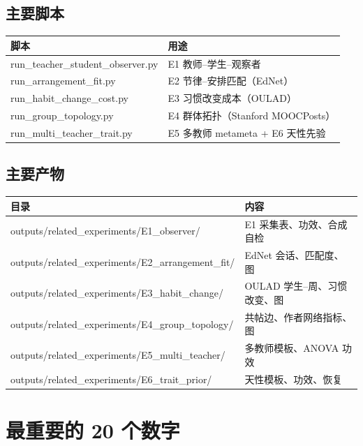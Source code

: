 \documentclass[UTF8,a4paper,11pt]{ctexart}
\begin{document}
\subsection{主要脚本}

\begin{longtable}{@{}p{6.4cm}p{7.0cm}@{}}
\toprule
\textbf{脚本} & \textbf{用途} \\
\midrule
run\_teacher\_student\_observer.py & E1 教师--学生--观察者 \\
run\_arrangement\_fit.py & E2 节律--安排匹配（EdNet） \\
run\_habit\_change\_cost.py & E3 习惯改变成本（OULAD） \\
run\_group\_topology.py & E4 群体拓扑（Stanford MOOCPosts） \\
run\_multi\_teacher\_trait.py & E5 多教师 metameta + E6 天性先验 \\
\bottomrule
\end{longtable}

\subsection{主要产物}

\begin{longtable}{@{}p{8.4cm}p{5.2cm}@{}}
\toprule
\textbf{目录} & \textbf{内容} \\
\midrule
outputs/related\_experiments/E1\_observer/ & E1 采集表、功效、合成自检 \\
outputs/related\_experiments/E2\_arrangement\_fit/ & EdNet 会话、匹配度、图 \\
outputs/related\_experiments/E3\_habit\_change/ & OULAD 学生--周、习惯改变、图 \\
outputs/related\_experiments/E4\_group\_topology/ & 共帖边、作者网络指标、图 \\
outputs/related\_experiments/E5\_multi\_teacher/ & 多教师模板、ANOVA 功效 \\
outputs/related\_experiments/E6\_trait\_prior/ & 天性模板、功效、恢复 \\
\bottomrule
\end{longtable}


\section{最重要的 20 个数字}
\end{document}

